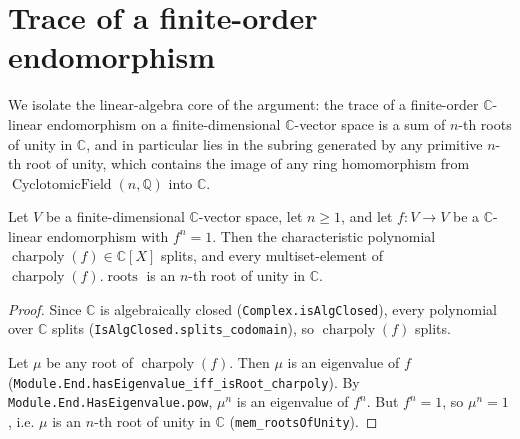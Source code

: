 \section{Trace of a finite-order endomorphism}

We isolate the linear-algebra core of the argument: the trace of a
finite-order $\mathbb{C}$-linear endomorphism on a finite-dimensional
$\mathbb{C}$-vector space is a sum of $n$-th roots of unity in
$\mathbb{C}$, and in particular lies in the subring generated by any
primitive $n$-th root of unity, which contains the image of any ring
homomorphism from $\operatorname{CyclotomicField}(n,\mathbb{Q})$ into
$\mathbb{C}$.

\begin{lemma}[$f^n = 1$ implies charpoly splits with roots in
    $\mu_n$]
    \label{lem:charpoly_roots_are_roots_of_unity}
    Let $V$ be a finite-dimensional $\mathbb{C}$-vector space, let
    $n \geq 1$, and let $f : V \to V$ be a $\mathbb{C}$-linear
    endomorphism with $f^n = 1$. Then the characteristic polynomial
    $\operatorname{charpoly}(f) \in \mathbb{C}[X]$ splits, and every
    multiset-element of $\operatorname{charpoly}(f).\operatorname{roots}$
    is an $n$-th root of unity in $\mathbb{C}$.
\end{lemma}
\begin{proof}
    Since $\mathbb{C}$ is algebraically closed
    (\texttt{Complex.isAlgClosed}), every polynomial over
    $\mathbb{C}$ splits (\texttt{IsAlgClosed.splits\_codomain}), so
    $\operatorname{charpoly}(f)$ splits.

    Let $\mu$ be any root of $\operatorname{charpoly}(f)$.  Then $\mu$
    is an eigenvalue of $f$
    (\texttt{Module.End.hasEigenvalue\_iff\_isRoot\_charpoly}). By
    \texttt{Module.End.HasEigenvalue.pow}, $\mu^n$ is an eigenvalue
    of $f^n$. But $f^n = 1$, so $\mu^n = 1$, i.e. $\mu$ is an
    $n$-th root of unity in $\mathbb{C}$ (\texttt{mem\_rootsOfUnity}).
\end{proof}

